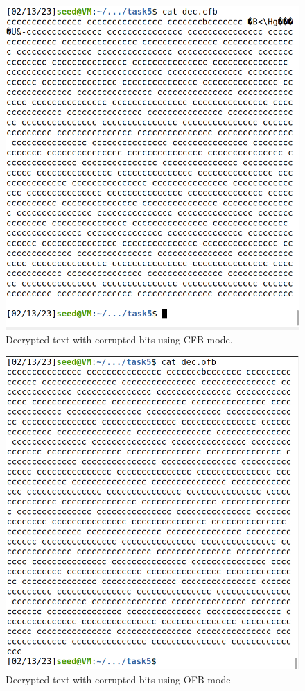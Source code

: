 \begin{figure}
    \centering
    \includegraphics[height=\textheight,width=\textwidth,keepaspectratio]
    {figures/dec_cfb_task5.png}
    \caption{Decrypted text with corrupted bits using CFB mode.}\label{fig:corrupted_cfb}
\end{figure}

\begin{figure}
    \centering
    \includegraphics[height=\textheight,width=\textwidth,keepaspectratio]
    {figures/dec_ofb_task5.png}
    \caption{Decrypted text with corrupted bits using OFB mode}\label{fig:corrupted_ofb}
\end{figure}

